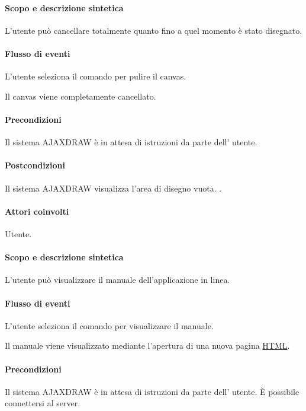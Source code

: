 \paragraph{Scopo e descrizione sintetica}
L'utente pu\`o cancellare totalmente quanto fino a quel momento \`e stato disegnato.
\paragraph{Flusso di eventi}
\begin{elenconumerato}[\textbf{}]{\subsubsecindent}
\item L'utente seleziona il comando per pulire il canvas. 
\item Il canvas viene completamente cancellato.
\end{elenconumerato}
\paragraph{Precondizioni}  Il sistema AJAXDRAW \`e in attesa di istruzioni da parte dell' utente.
\paragraph{Postcondizioni} Il sistema AJAXDRAW visualizza l'area di disegno vuota.
.

\paragraph{Attori coinvolti} Utente.
\paragraph{Scopo e descrizione sintetica}
L'utente pu\`o visualizzare il manuale dell'applicazione in linea.
\paragraph{Flusso di eventi}
\begin{elenconumerato}[\textbf{}]{\subsubsecindent}
\item L'utente seleziona il comando per visualizzare il manuale. 
\item Il manuale viene visualizzato mediante l'apertura di una nuova pagina {\underline{HTML}}.
\end{elenconumerato}
\paragraph{Precondizioni} Il sistema AJAXDRAW \`e in attesa di istruzioni da parte dell' utente. \`E possibile connettersi al server.
